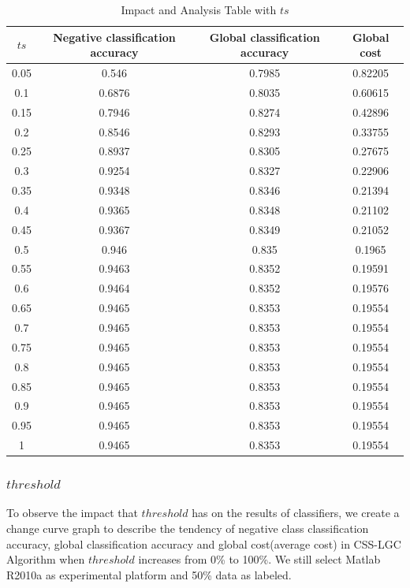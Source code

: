 \documentclass{svjour3}                     %
\begin{document}
\begin{table}[htbp]
  \centering
    \begin{tabular}{c c c c}
    \toprule
    $ts$  & Negative classification accuracy  &  Global classification accuracy & Global cost \\
    \midrule
    0.05  & 0.546 & 0.7985 & 0.82205 \\
    0.1   & 0.6876 & 0.8035 & 0.60615 \\
    0.15  & 0.7946 & 0.8274 & 0.42896 \\
    0.2   & 0.8546 & 0.8293 & 0.33755 \\
    0.25  & 0.8937 & 0.8305 & 0.27675 \\
    0.3   & 0.9254 & 0.8327 & 0.22906 \\
    0.35  & 0.9348 & 0.8346 & 0.21394 \\
    0.4   & 0.9365 & 0.8348 & 0.21102 \\
    0.45  & 0.9367 & 0.8349 & 0.21052 \\
    0.5   & 0.946 & 0.835 & 0.1965 \\
    0.55  & 0.9463 & 0.8352 & 0.19591 \\
    0.6   & 0.9464 & 0.8352 & 0.19576 \\
    0.65  & 0.9465 & 0.8353 & 0.19554 \\
    0.7   & 0.9465 & 0.8353 & 0.19554 \\
    0.75  & 0.9465 & 0.8353 & 0.19554 \\
    0.8   & 0.9465 & 0.8353 & 0.19554 \\
    0.85  & 0.9465 & 0.8353 & 0.19554 \\
    0.9   & 0.9465 & 0.8353 & 0.19554 \\
    0.95  & 0.9465 & 0.8353 & 0.19554 \\
    1     & 0.9465 & 0.8353 & 0.19554 \\
    \bottomrule
    \end{tabular}%
  \caption{Impact and Analysis Table with $ts$} \label{tab:ts}%
\end{table}%

\subsubsection{$threshold$}
To observe the impact that $threshold$ has on the results of classifiers, we create a change curve graph to describe the tendency of negative class classification accuracy, global classification accuracy and global cost(average cost) in CSS-LGC Algorithm when $threshold$ increases from 0\% to 100\%. We still select Matlab R2010a as experimental platform and 50\% data as labeled.
\end{document}
